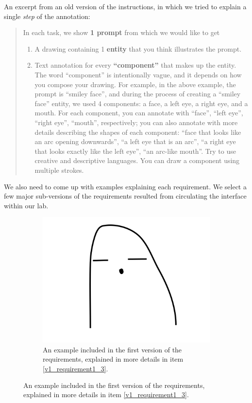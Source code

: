 An excerpt from an old version of the instructions, in which we tried to explain a single \textit{step} of the annotation:
\begin{quotation}
In each task, we show \textbf{1 prompt} from which we would like to get
\begin{enumerate}
    \item A drawing containing 1 \textbf{entity} that you think illustrates the prompt.
    \item Text annotation for every \textbf{``component''} that makes up the entity.
    The word ``component'' is intentionally vague, and it depends on how you compose your drawing. For example, in the above example, the prompt is ``smiley face'', and during the process of creating a ``smiley face'' entity, we used 4 components: a face, a left eye, a right eye, and a mouth. For each component, you can annotate with ``face'', ``left eye'', ``right eye'', ``mouth'', respectively; you can also annotate with more details describing the shapes of each component: ``face that looks like an arc opening downwards'', ``a left eye that is an arc'', ``a right eye that looks exactly like the left eye'', ``an arc-like mouth''. Try to use creative and descriptive languages. You can draw a component using multiple strokes.
\end{enumerate}
\end{quotation}
We also need to come up with examples explaining each requirement. We select a few major sub-versions of the requirements resulted from circulating the interface within our lab.  

\begin{figure}[!htb]
\begin{subfigure}{0.5\textwidth}
\centering
\includegraphics[width=.4\linewidth]{data_collection/host_amazon/hit_1/bad_smiley_face_ambiguous_face.png}  
\caption{An example included in the first version of the requirements, explained in more details in item \ref{v1_requirement1_3}.}
\label{v1.requirement_1.1}
\end{subfigure}
\end{figure}

